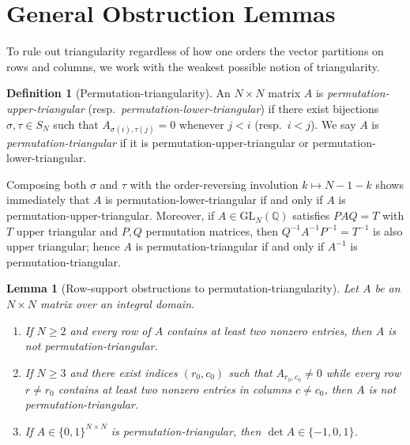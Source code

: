 \documentclass[11pt,a4paper]{article}
\newtheorem{lemma}[theorem]{Lemma}
\theoremstyle{definition}
\newtheorem{definition}[theorem]{Definition}
\theoremstyle{remark}
\newcommand{\QQ}{\mathbb{Q}}
\begin{document}
\section{General Obstruction Lemmas}

To rule out triangularity regardless of how one orders the vector partitions on rows and columns, we work with the weakest possible notion of triangularity.

\begin{definition}[Permutation-triangularity]
An $N \times N$ matrix $A$ is \emph{permutation-upper-triangular} (resp.\ \emph{permutation-lower-triangular}) if there exist bijections $\sigma, \tau \in S_N$ such that $A_{\sigma(i),\tau(j)} = 0$ whenever $j < i$ (resp.\ $i < j$). We say $A$ is \emph{permutation-triangular} if it is permutation-upper-triangular or permutation-lower-triangular.
\end{definition}

Composing both $\sigma$ and $\tau$ with the order-reversing involution $k \mapsto N - 1 - k$ shows immediately that $A$ is permutation-lower-triangular if and only if $A$ is permutation-upper-triangular. Moreover, if $A \in \mathrm{GL}_N(\QQ)$ satisfies $P A Q = T$ with $T$ upper triangular and $P, Q$ permutation matrices, then $Q^{-1} A^{-1} P^{-1} = T^{-1}$ is also upper triangular; hence $A$ is permutation-triangular if and only if $A^{-1}$ is permutation-triangular.

\begin{lemma}[Row-support obstructions to permutation-triangularity]\label{lem:tri-obs}
Let $A$ be an $N \times N$ matrix over an integral domain.
\begin{enumerate}
  \setlength{\itemsep}{2pt}
  \item[(i)] If $N \ge 2$ and every row of $A$ contains at least two nonzero entries, then $A$ is not permutation-triangular.
  \item[(ii)] If $N \ge 3$ and there exist indices $(r_0, c_0)$ such that $A_{r_0, c_0} \neq 0$ while every row $r \neq r_0$ contains at least two nonzero entries in columns $c \neq c_0$, then $A$ is not permutation-triangular.
  \item[(iii)] If $A \in \{0,1\}^{N \times N}$ is permutation-triangular, then $\det A \in \{-1, 0, 1\}$.
\end{enumerate}
\end{lemma}
\end{document}
